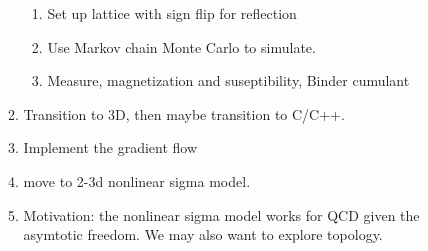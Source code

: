 \documentclass[english]{article}
\begin{document}
\begin{enumerate}
\begin{enumerate}
            \begin{enumerate}
                \item Set up lattice with sign flip for reflection
                \item Use Markov chain Monte Carlo to simulate.
                \item Measure, magnetization and suseptibility, Binder cumulant
            \end{enumerate}
            \item Transition to 3D, then maybe transition to C/C++.

            \item Implement the gradient flow

            \item move to 2-3d nonlinear sigma model. 

            \item Motivation: the nonlinear sigma model works for QCD given the asymtotic freedom. We may also want to explore topology.


        \end{enumerate}
\nocite{*}



\end{enumerate}
\end{document}
